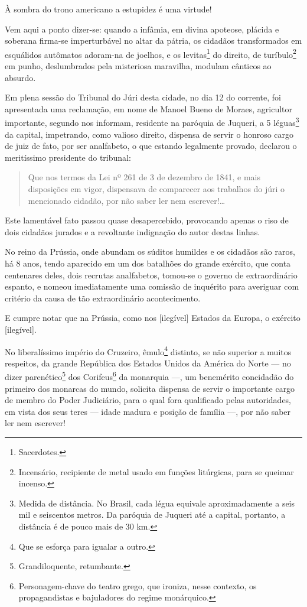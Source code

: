 À sombra do trono americano a estupidez é uma virtude!

Vem aqui a ponto dizer-se: quando a infâmia, em divina apoteose, plácida
e soberana firma-se imperturbável no altar da pátria, os cidadãos
transformados em esquálidos autômatos adoram-na de joelhos, e os
levitas\footnote{Sacerdotes.} do direito, de turíbulo\footnote{
  Incensário, recipiente de metal usado em funções litúrgicas, para se
  queimar incenso.} em punho, deslumbrados pela misteriosa maravilha,
modulam cânticos ao absurdo.

Em plena sessão do Tribunal do Júri desta cidade, no dia 12 do corrente,
foi apresentada uma reclamação, em nome de Manoel Bueno de Moraes,
agricultor importante, segundo nos informam, residente na paróquia de
Juqueri, a 5 léguas\footnote{Medida de distância. No Brasil, cada
  légua equivale aproximadamente a seis mil e seiscentos metros. Da
  paróquia de Juqueri até a capital, portanto, a distância é de pouco
  mais de 30 km.} da capital, impetrando, como valioso direito, dispensa
de servir o honroso cargo de juiz de fato, por ser analfabeto, o que
estando legalmente provado, declarou o meritíssimo presidente do
tribunal:

\begin{quote}
Que nos termos da Lei nº 261 de 3 de dezembro de 1841, e mais
disposições em vigor, dispensava de comparecer aos trabalhos do júri o
mencionado cidadão, por não saber ler nem escrever!\ldots{}
\end{quote}

Este lamentável fato passou quase desapercebido, provocando apenas o
riso de dois cidadãos jurados e a revoltante indignação do autor destas
linhas.

No reino da Prússia, onde abundam os súditos humildes e os cidadãos são
raros, há 8 anos, tendo aparecido em um dos batalhões do grande
exército, que conta centenares deles, dois recrutas analfabetos,
tomou-se o governo de extraordinário espanto, e nomeou imediatamente uma
comissão de inquérito para averiguar com critério da causa de tão
extraordinário acontecimento.

E cumpre notar que na Prússia, como nos {[}ilegível{]} Estados da
Europa, o exército {[}ilegível{]}.

No liberalíssimo império do Cruzeiro, êmulo\footnote{Que se esforça
  para igualar a outro.} distinto, se não superior a muitos respeitos,
da grande República dos Estados Unidos da América do Norte --- no dizer
parenético\footnote{Grandiloquente, retumbante.} dos
Corifeus\footnote{Personagem-chave do teatro grego, que ironiza, nesse
  contexto, os propagandistas e bajuladores do regime monárquico.} da
monarquia ---, um benemérito concidadão do primeiro dos monarcas do
mundo, solicita dispensa de servir o importante cargo de membro do Poder
Judiciário, para o qual fora qualificado pelas autoridades, em vista dos
seus teres --- idade madura e posição de família ---, por não saber ler
nem escrever!


